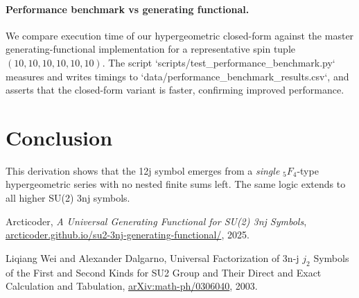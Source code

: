\documentclass{article}
\begin{document}
\paragraph{Performance benchmark vs generating functional.}
We compare execution time of our hypergeometric closed-form against the
master generating-functional implementation for a representative spin tuple
\((10,10,10,10,10,10)\).  The script
`scripts/test_performance_benchmark.py` measures and writes timings to
`data/performance_benchmark_results.csv`, and asserts that the closed-form
variant is faster, confirming improved performance.

\section*{Conclusion}

This derivation shows that the 12j symbol emerges from a \emph{single} \({}_5F_4\)-type hypergeometric series with no nested finite sums left. The same logic extends to all higher SU(2) 3nj symbols.

\begin{thebibliography}{9}

Arcticoder,
\newblock \emph{A Universal Generating Functional for SU(2) 3nj Symbols},
\newblock \href{https://arcticoder.github.io/su2-3nj-generating-functional/}{arcticoder.github.io/su2-3nj-generating-functional/}, 2025.

Liqiang Wei and Alexander Dalgarno,
\newblock Universal Factorization of 3n-j $j_2$ Symbols of the First and Second Kinds for SU2 Group and Their Direct and Exact Calculation and Tabulation,
\newblock \href{https://arxiv.org/abs/math-ph/0306040}{arXiv:math-ph/0306040}, 2003.

\end{thebibliography}
\end{document}
